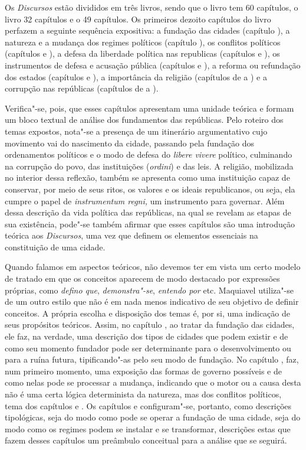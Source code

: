 Os \emph{Discursos} estão divididos em três livros, sendo que o livro 
tem 60 capítulos, o livro  32 capítulos e o  49 capítulos. Os
primeiros dezoito capítulos do livro  perfazem a seguinte sequência
expositiva: a fundação das cidades (capítulo ), a natureza e a mudança
dos regimes políticos (capítulo ), os conflitos políticos (capítulos
 e ), a defesa da liberdade política nas republicas (capítulos  e
), os instrumentos de defesa e acusação pública (capítulos  e
), a reforma ou refundação dos estados (capítulos  e ), a
importância da religião (capítulos de  a ) e a corrupção nas
repúblicas (capítulos de  a ).

Verifica"-se, pois, que esses capítulos apresentam uma unidade teórica e
formam um bloco textual de análise dos fundamentos das repúblicas. Pelo
roteiro dos temas expostos, nota"-se a presença de um itinerário
argumentativo cujo movimento vai do nascimento da cidade, passando pela
fundação dos ordenamentos políticos e o modo de defesa do \emph{libere
vivere} político, culminando na corrupção do povo, das instituições
(\emph{ordini}) e das leis. A religião, mobilizada no interior dessa
reflexão, também se apresenta como uma instituição capaz de conservar,
por meio de seus ritos, os valores e os ideais republicanos, ou seja,
ela cumpre o papel de \emph{instrumentum regni,} um instrumento para
governar. Além dessa descrição da vida política das repúblicas, na qual
se revelam as etapas de sua existência, pode"-se também afirmar que esses
capítulos são uma introdução teórica aos \emph{Discursos}, uma vez que
definem os elementos essenciais na constituição de uma cidade.

Quando falamos em aspectos teóricos, não devemos ter em vista um certo
modelo de tratado em que os conceitos aparecem de modo destacado por
expressões próprias, como \emph{defino que}, \emph{demonstra"-se},
\emph{entendo por} etc. Maquiavel utiliza"-se de um outro estilo que não
é em nada menos indicativo de seu objetivo de definir conceitos. A
própria escolha e disposição dos temas é, por si, uma indicação de seus
propósitos teóricos. Assim, no capítulo , ao tratar da fundação das
cidades, ele faz, na verdade, uma descrição dos tipos de cidades que
podem existir e de como seu momento fundador pode ser determinante para
o desenvolvimento ou para a ruína futura, tipificando"-as pelo seu modo
de fundação. No capítulo , faz, num primeiro momento, uma exposição
das formas de governo possíveis e de como nelas pode se processar a
mudança, indicando que o motor ou a causa desta não é uma certa lógica
determinista da natureza, mas dos conflitos políticos, tema dos
capítulos  e . Os capítulos  e  configuram"-se, portanto, como
descrições tipológicas, seja do modo como pode se operar a fundação de
uma cidade, seja do modo como os regimes podem se instalar e se
transformar, descrições estas que fazem desses capítulos um preâmbulo
conceitual para a análise que se seguirá.

